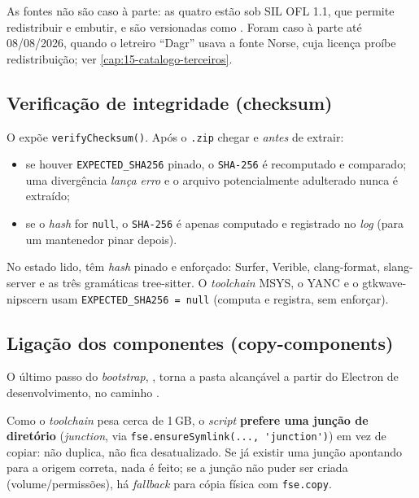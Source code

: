 As fontes não são caso à parte: as quatro estão sob SIL OFL 1.1, que permite
redistribuir e embutir, e são versionadas como . Foram caso à parte
até 08/08/2026, quando o letreiro \enquote{Dagr} usava a fonte Norse, cuja
licença proíbe redistribuição; ver \autoref{cap:15-catalogo-terceiros}.

\subsection{Verificação de integridade (checksum)}
\label{sec:16-checksum}

O  expõe \lstinline|verifyChecksum()|.
Após o \texttt{.zip} chegar e \emph{antes} de extrair:

\begin{itemize}[nosep]
  \item se houver \texttt{EXPECTED\_SHA256} pinado, o \texttt{SHA-256} é
        recomputado e comparado; uma divergência \emph{lança erro} e o arquivo
        potencialmente adulterado nunca é extraído;
  \item se o \emph{hash} for \lstinline|null|, o \texttt{SHA-256} é apenas
        computado e registrado no \emph{log} (para um mantenedor pinar depois).
\end{itemize}

\noindent
No estado lido, têm \emph{hash} pinado e enforçado: Surfer, Verible,
clang-format, slang-server e as três gramáticas tree-sitter. O \emph{toolchain}
MSYS, o YANC e o gtkwave-nipscern usam \lstinline|EXPECTED_SHA256 = null|
(computa e registra, sem enforçar).

\subsection{Ligação dos componentes (copy-components)}
\label{sec:16-copy-components}

O último passo do \emph{bootstrap}, ,
torna a pasta  alcançável a partir do Electron de
desenvolvimento, no caminho .

Como o \emph{toolchain} pesa cerca de 1\,GB, o \emph{script} \textbf{prefere uma
junção de diretório} (\emph{junction}, via \lstinline|fse.ensureSymlink(..., 'junction')|)
em vez de copiar: não duplica, não fica desatualizado. Se já existir uma junção
apontando para a origem correta, nada é feito; se a junção não puder ser criada
(volume/permissões), há \emph{fallback} para cópia física com
\lstinline|fse.copy|.

